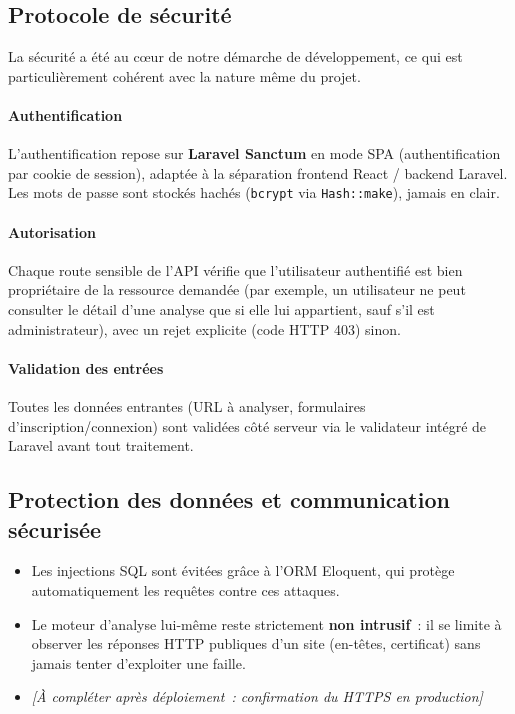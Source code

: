 \subsection{Protocole de s\'ecurit\'e}

La s\'ecurit\'e a \'et\'e au c\oe ur de notre d\'emarche de d\'eveloppement, ce qui est
particuli\`erement coh\'erent avec la nature m\^eme du projet.

\paragraph{Authentification} L'authentification repose sur \textbf{Laravel
Sanctum} en mode SPA (authentification par cookie de session), adapt\'ee \`a la
s\'eparation frontend React / backend Laravel. Les mots de passe sont stock\'es
hach\'es (\texttt{bcrypt} via \texttt{Hash::make}), jamais en clair.

\paragraph{Autorisation} Chaque route sensible de l'API v\'erifie que
l'utilisateur authentifi\'e est bien propri\'etaire de la ressource demand\'ee (par
exemple, un utilisateur ne peut consulter le d\'etail d'une analyse que si elle
lui appartient, sauf s'il est administrateur), avec un rejet explicite (code
HTTP 403) sinon.

\paragraph{Validation des entr\'ees} Toutes les donn\'ees entrantes (URL \`a
analyser, formulaires d'inscription/connexion) sont valid\'ees c\^ot\'e serveur via
le validateur int\'egr\'e de Laravel avant tout traitement.

\subsection{Protection des donn\'ees et communication s\'ecuris\'ee}

\begin{itemize}
  \item Les injections SQL sont \'evit\'ees gr\^ace \`a l'ORM Eloquent, qui prot\`ege
    automatiquement les requ\^etes contre ces attaques.
  \item Le moteur d'analyse lui-m\^eme reste strictement \textbf{non intrusif}~: il
    se limite \`a observer les r\'eponses HTTP publiques d'un site (en-t\^etes,
    certificat) sans jamais tenter d'exploiter une faille.
  \item %
        \textit{[\`A compl\'eter apr\`es d\'eploiement~: confirmation du HTTPS en production]}
\end{itemize}

